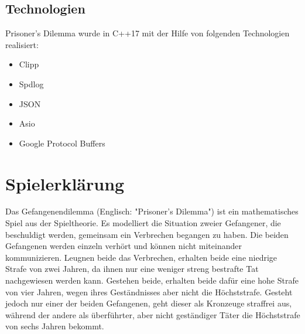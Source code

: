 \documentclass[12pt, letterpaper]{article}
\begin{document}
\subsection{Technologien}
Prisoner's Dilemma wurde in C++17 mit der Hilfe von folgenden Technologien realisiert:
\begin{itemize}
	\item Clipp
	\item Spdlog
	\item JSON
	\item Asio
	\item Google Protocol Buffers
\end{itemize}

\newpage

\section{Spielerklärung}
Das Gefangenendilemma (Englisch: "Prisoner's Dilemma") ist ein mathematisches Spiel aus der Spieltheorie. Es modelliert die Situation zweier Gefangener, die beschuldigt werden, gemeinsam ein Verbrechen begangen zu haben. Die beiden Gefangenen werden einzeln verhört und können nicht miteinander kommunizieren. Leugnen beide das Verbrechen, erhalten beide eine niedrige Strafe von zwei Jahren, da ihnen nur eine weniger streng bestrafte Tat nachgewiesen werden kann. Gestehen beide, erhalten beide dafür eine hohe Strafe von vier Jahren, wegen ihres Geständnisses aber nicht die Höchststrafe. Gesteht jedoch nur einer der beiden Gefangenen, geht dieser als Kronzeuge straffrei aus, während der andere als überführter, aber nicht geständiger Täter die Höchststrafe von sechs Jahren bekommt.
\end{document}
